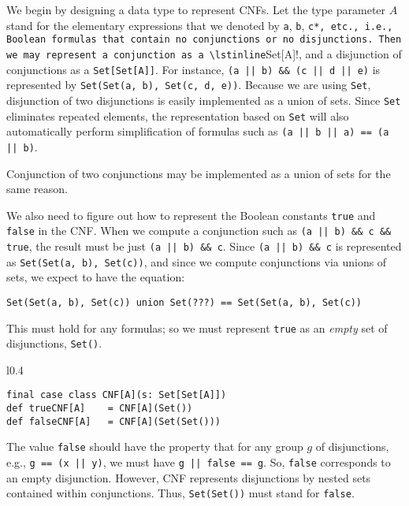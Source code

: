 We begin by designing a data type to represent CNFs. Let the type
parameter $A$ stand for the elementary expressions that we denoted
by \lstinline!a!, \lstinline!b!, \lstinline*!c*, etc., i.e., Boolean
formulas that contain no conjunctions or no disjunctions. Then we
may represent a conjunction as a \lstinline!Set[A]!, and a disjunction
of conjunctions as a \lstinline!Set[Set[A]]!. For instance, \lstinline!(a || b) && (c || d || e)!
is represented by \lstinline!Set(Set(a, b), Set(c, d, e))!. Because
we are using \lstinline!Set!, disjunction of two disjunctions is
easily implemented as a union of sets. Since \lstinline!Set! eliminates
repeated elements, the representation based on \lstinline!Set! will
also automatically perform simplification of formulas such as \lstinline!(a || b || a) == (a || b)!.

Conjunction of two conjunctions may be implemented as a union of sets
for the same reason.

We also need to figure out how to represent the Boolean constants
\lstinline!true! and \lstinline!false! in the CNF. When we compute
a conjunction such as \lstinline!(a || b) && c && true!, the result
must be just \lstinline!(a || b) && c!. Since \lstinline!(a || b) && c!
is represented as \lstinline!Set(Set(a, b), Set(c))!, and since we
compute conjunctions via unions of sets, we expect to have the equation:
\begin{lstlisting}
Set(Set(a, b), Set(c)) union Set(???) == Set(Set(a, b), Set(c))
\end{lstlisting}
This must hold for any formulas; so we must represent \lstinline!true!
as an \emph{empty} set of disjunctions, \lstinline!Set()!.

\begin{wrapfigure}{l}{0.4\columnwidth}%
\vspace{-0.6\baselineskip}
\begin{lstlisting}
final case class CNF[A](s: Set[Set[A]])
def trueCNF[A]    = CNF[A](Set())
def falseCNF[A]   = CNF[A](Set(Set()))
\end{lstlisting}
\vspace{-0.8\baselineskip}
\end{wrapfigure}%

The value \lstinline!false! should have the property that for any
group $g$ of disjunctions, e.g., \lstinline!g == (x || y)!, we must
have \lstinline!g || false == g!. So, \lstinline!false! corresponds
to an empty disjunction. However, CNF represents disjunctions by nested
sets contained within conjunctions. Thus, \lstinline!Set(Set())!
must stand for \lstinline!false!.

